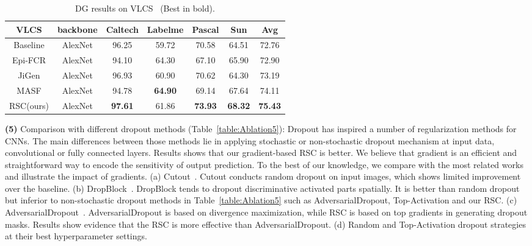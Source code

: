 \documentclass[runningheads]{llncs}
\begin{document}
\begin{table}[!htb]
\footnotesize
\centering \fontsize{7}{8}\selectfont
\begin{tabular}{c| c| c| c| c| c|| c } \hline VLCS & backbone & Caltech & Labelme & Pascal & Sun & Avg  \\ [0.5ex] \hline\hline Baseline\cite{carlucci2019domain} & AlexNet & 96.25 & 59.72 & 70.58 & 64.51 & 72.76\\ Epi-FCR\cite{li2019episodic} & AlexNet& 94.10 & 64.30 & 67.10 & 65.90 & 72.90  \\
JiGen\cite{carlucci2019domain} & AlexNet & 96.93 & 60.90 & 70.62 & 64.30 & 73.19 \\ MASF\cite{dou2019domain} & AlexNet & 94.78 & \textbf{64.90} & 69.14 & 67.64 & 74.11 \\ RSC(ours) & AlexNet & \textbf{97.61} & 61.86 & \textbf{73.93} & \textbf{68.32} & \textbf{75.43} \\ \hline 
\end{tabular}
\vspace{0.5em}
\caption{DG results on VLCS~\cite{torralba2011unbiased} (Best in bold).} \vspace{-1em}
\label{table:VLCS} \end{table}

\textbf{(5)} Comparison with different dropout methods (Table~\ref{table:Ablation5}): 
Dropout has inspired a number of regularization methods for CNNs. The main differences between those methods lie in applying stochastic or non-stochastic dropout mechanism at input data, convolutional or fully connected layers. Results shows that our gradient-based RSC is better. We believe that gradient is an efficient and straightforward way to encode the sensitivity of output prediction. To the best of our knowledge, we compare with the most related works and illustrate the impact of gradients. 
(a) Cutout~\cite{devries2017improved}. Cutout conducts random dropout on input images, which shows limited improvement over the baseline. 
(b) DropBlock~\cite{ghiasi2018dropblock}. DropBlock tends to dropout discriminative activated parts spatially. It is better than random dropout but inferior to non-stochastic dropout methods in Table~\ref{table:Ablation5} such as AdversarialDropout, Top-Activation and our RSC.
(c) AdversarialDropout~\cite{park2018adversarial,lee2019drop}. AdversarialDropout is based on divergence maximization, while RSC is based on top gradients in generating dropout masks. Results show evidence that the RSC is more effective than AdversarialDropout. 
(d) Random and Top-Activation dropout strategies at their best hyperparameter settings. 
\end{document}
